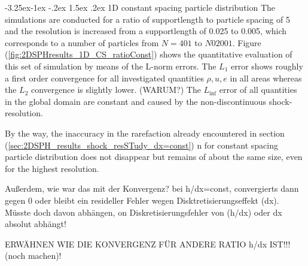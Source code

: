 \documentclass{report}
\makeatletter
\renewcommand\paragraph{\@startsection{paragraph}{4}{\z@}%
  {-3.25ex\@plus -1ex \@minus -.2ex}%
  {1.5ex \@plus .2ex}%
  {\normalfont\normalsize\bfseries}}
\makeatother
\begin{document}
\paragraph{1D constant spacing particle distribution}
The simulations are conducted for a ratio of supportlength to particle spacing of 5 and the resolution is increased from a supportlength of 0.025 to 0.005, which corresponds to a number of particles from $N=401$ to $N02001$. 
Figure (\ref{fig:2DSPHresults_1D_CS_ratioConst}) shows the quantitative evaluation of this set of simulation by means of the L-norm errors. The $L_1$ error shows roughly a first order convergence for all investigated quantities $\rho, u, e$ in all areas whereas the $L_2$ convergence is slightly lower.  (WARUM?)
The $L_{\inf}$ error of all quantities in the global domain are constant and caused by the non-discontinuous shock-resolution.

By the way, the inaccuracy in the rarefaction already encountered in section (\ref{sec:2DSPH_results_shock_resSTudy_dx=const}) n for constant spacing particle distribution does not disappear but remains of about the same size, even for the highest resolution. 

Außerdem, wie war das mit der Konvergenz? bei h/dx=const, convergierts dann gegen 0 oder bleibt ein resideller Fehler wegen Disktretisierungseffekt (dx). Müsste doch davon abhängen, on Diskretisierungsfehler von (h/dx) oder dx absolut abhängt!

ERWÄHNEN WIE DIE KONVERGENZ FÜR ANDERE RATIO h/dx IST!!! (noch machen)!
 
\end{document}

